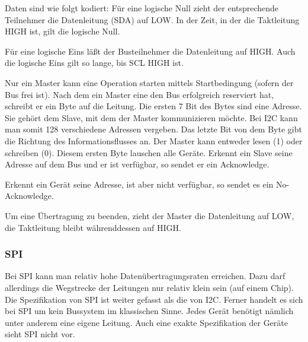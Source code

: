 
Daten sind wie folgt kodiert: Für eine logische Null zieht der entsprechende Teilnehmer die Datenleitung (SDA) auf LOW. In der Zeit, in der die Taktleitung HIGH ist, gilt die logische Null. 


Für eine logische Eins läßt der Busteilnehmer die Datenleitung auf HIGH. Auch die logische Eins gilt so lange, bis SCL HIGH ist. 


Nur ein Master kann eine Operation starten mittels Startbedingung (sofern der Bus frei ist). Nach dem ein Master eine den Bus erfolgreich reserviert hat, schreibt er ein Byte auf die Leitung. Die ersten 7 Bit des Bytes sind eine Adresse. Sie gehört dem Slave, mit dem der Master kommunizieren möchte. Bei \ac{I2C}  kann man somit 128 verschiedene Adressen vergeben. Das letzte Bit von dem Byte gibt die Richtung des Informationsflusses an. Der Master kann entweder lesen (1) oder schreiben (0). Diesem ersten Byte lauschen alle Geräte. Erkennt ein Slave seine Adresse auf dem Bus und er ist verfügbar, so sendet er ein Acknowledge.


Erkennt ein Gerät seine Adresse, ist aber nicht verfügbar, so sendet es ein No-Acknowledge.


Um eine Übertragung zu beenden, zieht der Master die Datenleitung auf LOW, die Taktleitung bleibt währenddessen auf HIGH. 



\subsubsection{\ac{SPI}}
Bei \ac{SPI} kann man relativ hohe Datenübertragungsraten erreichen. Dazu darf allerdings die Wegstrecke der Leitungen nur relativ klein sein (auf einem Chip). Die Spezifikation von \ac{SPI} ist weiter gefasst als die von \ac{I2C}. Ferner handelt es sich bei \ac{SPI} um kein Bussystem im klassischen Sinne. Jedes Gerät benötigt nämlich unter anderem eine eigene Leitung. Auch eine exakte Spezifikation der Geräte sieht \ac{SPI} nicht vor. 


